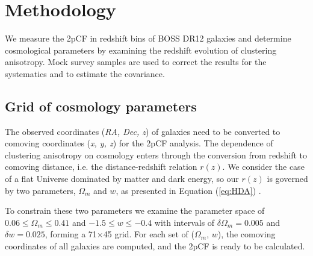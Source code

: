 \documentclass[iop]{emulateapj}
\begin{document}
\section{Methodology}\label{sec:methodology}

We measure the 2pCF in redshift bins of BOSS DR12 galaxies and 
determine cosmological parameters by examining the redshift evolution of clustering anisotropy.
Mock survey samples are used to correct the results for the systematics and to estimate the covariance.

\subsection{Grid of cosmology parameters}

The observed coordinates ({\it RA, Dec, z}) of galaxies
need to be converted to comoving coordinates ({\it x, y, z}) for the 2pCF analysis.
The dependence of clustering anisotropy on cosmology enters through the conversion from redshift to comoving distance,
i.e. the distance-redshift relation $r(z)$.
We consider the case of a flat Universe dominated by matter and dark energy,
so our $r(z)$ is governed by two parameters, $\Omega_m$ and $w$, as presented in Equation (\ref{eq:HDA})	.

To constrain these two parameters we examine the parameter space of 
$0.06\leq \Omega_m\leq 0.41$ and $-1.5 \leq w \leq -0.4$ with intervals of 
$\delta \Omega_m = 0.005$ and $\delta w = 0.025$,
forming a 71$\times$45 grid.
For each set of ($\Omega_m$, $w$), 
the comoving coordinates of all galaxies are computed, 
and the 2pCF is ready to be calculated.
\end{document}
